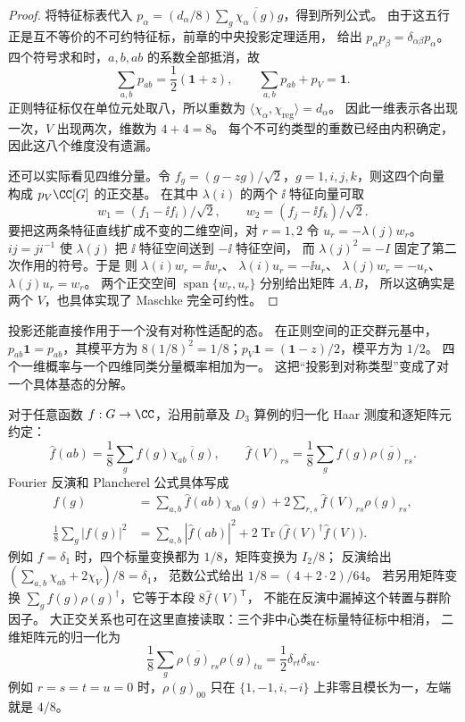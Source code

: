 \begin{proof}
将特征标表代入 $p_\alpha=(d_\alpha/8)
\sum_g\overline{\chi_\alpha(g)}g$，得到所列公式。
由于这五行正是互不等价的不可约特征标，前章的中央投影定理适用，
给出 $p_\alpha p_\beta=\delta_{\alpha\beta}p_\alpha$。
四个符号求和时，$a,b,ab$ 的系数全部抵消，故
\[
\sum_{a,b}p_{ab}=\frac12(\mathbf1+z),
\qquad \sum_{a,b}p_{ab}+p_V=\mathbf1.
\]
正则特征标仅在单位元处取八，所以重数为
$\langle\chi_\alpha,\chi_{\mathrm{reg}}\rangle=d_\alpha$。
因此一维表示各出现一次，$V$ 出现两次，维数为 $4+4=8$。
每个不可约类型的重数已经由内积确定，因此这八个维度没有遗漏。

还可以实际看见四维分量。令
$f_g=(g-zg)/\sqrt2$，$g=1,i,j,k$，则这四个向量
构成 $p_V\CC[G]$ 的正交基。
在其中 $\lambda(i)$ 的两个 $\ii$ 特征向量可取
\[
w_1=(f_1-\ii f_i)/\sqrt2,
\qquad w_2=(f_j-\ii f_k)/\sqrt2.
\]
要把这两条特征直线扩成不变的二维空间，对 $r=1,2$ 令 $u_r=-\lambda(j)w_r$。
$ij=ji^{-1}$ 使 $\lambda(j)$ 把 $\ii$ 特征空间送到 $-\ii$ 特征空间，
而 $\lambda(j)^2=-I$ 固定了第二次作用的符号。于是
则 $\lambda(i)w_r=\ii w_r$、
$\lambda(i)u_r=-\ii u_r$、
$\lambda(j)w_r=-u_r$、$\lambda(j)u_r=w_r$。
两个正交空间 $\operatorname{span}\{w_r,u_r\}$ 分别给出矩阵 $A,B$，
所以这确实是两个 $V$，也具体实现了 Maschke 完全可约性。
\end{proof}

投影还能直接作用于一个没有对称性适配的态。
在正则空间的正交群元基中，$p_{ab}\mathbf1=p_{ab}$，其模平方为
$8(1/8)^2=1/8$；$p_V\mathbf1=(\mathbf1-z)/2$，模平方为 $1/2$。
四个一维概率与一个四维同类分量概率相加为一。
这把“投影到对称类型”变成了对一个具体基态的分解。

对于任意函数 $f:G\to\CC$，沿用前章及 $D_3$ 算例的归一化 Haar 测度和逐矩阵元约定：
\[
\widehat f(ab)=\frac18\sum_g f(g)\overline{\chi_{ab}(g)},
\qquad \widehat f(V)_{rs}=\frac18\sum_g f(g)\overline{\rho(g)_{rs}}.
\]
Fourier 反演和 Plancherel 公式具体写成
\[
\begin{aligned}
f(g)&=\sum_{a,b}\widehat f(ab)\chi_{ab}(g)
 +2\sum_{r,s}\widehat f(V)_{rs}\rho(g)_{rs},\\
\frac18\sum_g|f(g)|^2&=\sum_{a,b}|\widehat f(ab)|^2
 +2\operatorname{Tr}\bigl(\widehat f(V)^\dagger\widehat f(V)\bigr).
\end{aligned}
\]
例如 $f=\delta_1$ 时，四个标量变换都为 $1/8$，矩阵变换为 $I_2/8$；
反演给出 $(\sum_{a,b}\chi_{ab}+2\chi_V)/8=\delta_1$，
范数公式给出 $1/8=(4+2\cdot2)/64$。
若另用矩阵变换 $\sum_gf(g)\rho(g)^\dagger$，它等于本段 $8\widehat f(V)^{\mathsf T}$，
不能在反演中漏掉这个转置与群阶因子。
大正交关系也可在这里直接读取：三个非中心类在标量特征标中相消，
二维矩阵元的归一化为
\[
\frac18\sum_g\overline{\rho(g)_{rs}}\rho(g)_{tu}
=\frac12\delta_{rt}\delta_{su}.
\]
例如 $r=s=t=u=0$ 时，$\rho(g)_{00}$ 只在
$\{1,-1,i,-i\}$ 上非零且模长为一，左端就是 $4/8$。

